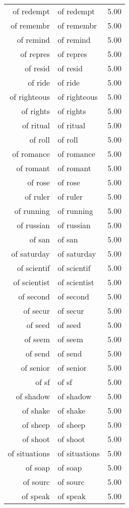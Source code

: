 \begin{table}[ht]
\begin{tabular}{rlr}
  of redempt & of redempt & 5.00 \\ 
  of remembr & of remembr & 5.00 \\ 
  of remind & of remind & 5.00 \\ 
  of repres & of repres & 5.00 \\ 
  of resid & of resid & 5.00 \\ 
  of ride & of ride & 5.00 \\ 
  of righteous & of righteous & 5.00 \\ 
  of rights & of rights & 5.00 \\ 
  of ritual & of ritual & 5.00 \\ 
  of roll & of roll & 5.00 \\ 
  of romance & of romance & 5.00 \\ 
  of romant & of romant & 5.00 \\ 
  of rose & of rose & 5.00 \\ 
  of ruler & of ruler & 5.00 \\ 
  of running & of running & 5.00 \\ 
  of russian & of russian & 5.00 \\ 
  of san & of san & 5.00 \\ 
  of saturday & of saturday & 5.00 \\ 
  of scientif & of scientif & 5.00 \\ 
  of scientist & of scientist & 5.00 \\ 
  of second & of second & 5.00 \\ 
  of secur & of secur & 5.00 \\ 
  of seed & of seed & 5.00 \\ 
  of seem & of seem & 5.00 \\ 
  of send & of send & 5.00 \\ 
  of senior & of senior & 5.00 \\ 
  of sf & of sf & 5.00 \\ 
  of shadow & of shadow & 5.00 \\ 
  of shake & of shake & 5.00 \\ 
  of sheep & of sheep & 5.00 \\ 
  of shoot & of shoot & 5.00 \\ 
  of situations & of situations & 5.00 \\ 
  of soap & of soap & 5.00 \\ 
  of sourc & of sourc & 5.00 \\ 
  of speak & of speak & 5.00 \\ 

\end{tabular}
\end{table}
